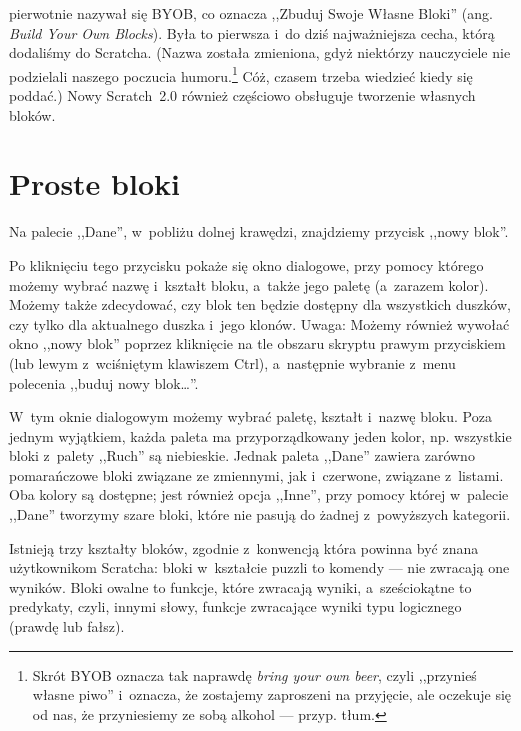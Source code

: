 \documentclass[a4paper]{report}
\begin{document}
\Snap{} pierwotnie nazywał się BYOB, co oznacza ,,Zbuduj Swoje Własne Bloki'' (ang. \textit{Build Your Own Blocks}). Była to pierwsza i~do dziś najważniejsza cecha, którą dodaliśmy do Scratcha. (Nazwa została zmieniona, gdyż niektórzy nauczyciele nie podzielali naszego poczucia humoru.\footnote{Skrót BYOB oznacza tak naprawdę \textit{bring your own beer}, czyli ,,przynieś własne piwo'' i~oznacza, że zostajemy zaproszeni na przyjęcie, ale oczekuje się od nas, że przyniesiemy ze sobą alkohol --- przyp. tłum.} Cóż, czasem trzeba wiedzieć kiedy się poddać.) Nowy Scratch~2.0 również częściowo obsługuje tworzenie własnych bloków.

\section{Proste bloki}

Na palecie ,,Dane'', w~pobliżu dolnej krawędzi, znajdziemy przycisk ,,nowy blok''.\nopagebreak

\begin{figure}[H]
\centering

\end{figure}

Po kliknięciu tego przycisku pokaże się okno dialogowe, przy pomocy którego możemy wybrać nazwę i~kształt bloku, a~także jego paletę (a~zarazem kolor). Możemy także zdecydować, czy blok ten będzie dostępny dla wszystkich duszków, czy tylko dla aktualnego duszka i~jego klonów. Uwaga: Możemy również wywołać okno ,,nowy blok'' poprzez kliknięcie na tle obszaru skryptu prawym przyciskiem (lub lewym z~wciśniętym klawiszem Ctrl), a~następnie wybranie z~menu polecenia ,,buduj nowy blok\ldots''.


W~tym oknie dialogowym możemy wybrać paletę, kształt i~nazwę bloku. Poza jednym wyjątkiem, każda paleta ma przyporządkowany jeden kolor, np. wszystkie bloki z~palety ,,Ruch'' są niebieskie. Jednak paleta ,,Dane'' zawiera zarówno pomarańczowe bloki związane ze zmiennymi, jak i~czerwone, związane z~listami. Oba kolory są dostępne; jest również opcja ,,Inne'', przy pomocy której w~palecie ,,Dane'' tworzymy szare bloki, które nie pasują do żadnej z~powyższych kategorii.

Istnieją trzy kształty bloków, zgodnie z~konwencją która powinna być znana użytkownikom Scratcha: bloki w~kształcie puzzli to komendy --- nie zwracają one wyników. Bloki owalne to funkcje, które zwracają wyniki, a~sześciokątne to predykaty, czyli, innymi słowy, funkcje zwracające wyniki typu logicznego (prawdę lub fałsz).
\end{document}
